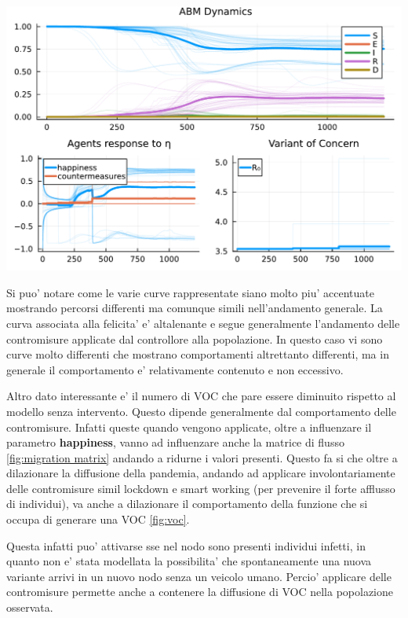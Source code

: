 \begin{minipage}{\linewidth}
	\centering
	\includegraphics[width=\textwidth]{img/SocialNetworkABM_CONTROL_2023-07-15.pdf}
	\label{fig:abm_intervent}
\end{minipage}

Si puo' notare come le varie curve rappresentate siano molto piu' accentuate mostrando percorsi differenti 
ma comunque simili nell'andamento generale. La curva associata alla felicita' e' altalenante e segue generalmente
l'andamento delle contromisure applicate dal controllore alla popolazione. In questo caso vi sono curve
molto differenti che mostrano comportamenti altrettanto differenti, ma in generale il comportamento e' 
relativamente contenuto e non eccessivo. 

Altro dato interessante e' il numero di VOC che pare essere diminuito rispetto al modello senza intervento.
Questo dipende generalmente dal comportamento delle contromisure. Infatti queste quando vengono applicate, 
oltre a influenzare il parametro \textbf{happiness}, vanno ad influenzare anche la matrice di flusso \ref{fig:migration matrix}
andando a ridurne i valori presenti. Questo fa si che oltre a dilazionare la diffusione della pandemia, andando 
ad applicare involontariamente delle contromisure simil lockdown e smart working (per prevenire il forte afflusso di individui),
va anche a dilazionare il comportamento della funzione che si occupa di generare una VOC \ref{fig:voc}. 

Questa infatti puo' attivarse sse nel nodo sono presenti individui infetti, in quanto non e' stata modellata la 
possibilita' che spontaneamente una nuova variante arrivi in un nuovo nodo senza un veicolo umano. Percio' 
applicare delle contromisure permette anche a contenere la diffusione di VOC nella popolazione osservata.
